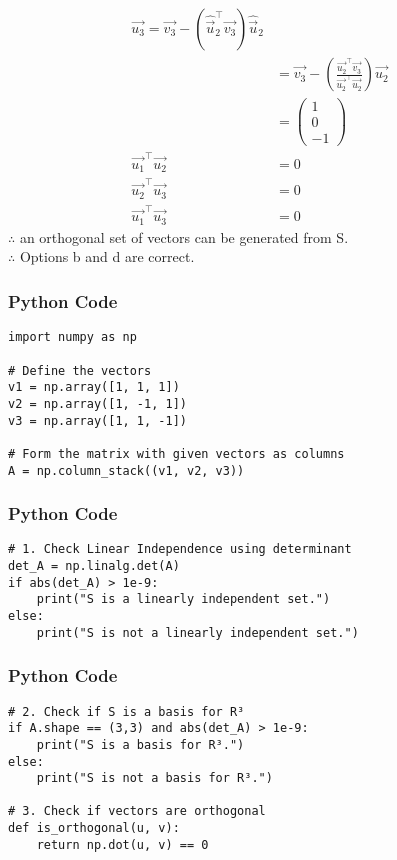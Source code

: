 \documentclass{beamer}
\begin{document}
\begin{frame}
\begin{align}
\vec{u_3}= \vec{v_3} - (\hat{\vec{u}}_2^\top \vec{v_3}) \hat{\vec{u}}_2 \\&= \vec{v_3} - \left( \frac{\vec{u_2}^\top \vec{v_3}}{\vec{u_2}^\top \vec{u_2}} \right) \vec{u_2} \\&= \begin{pmatrix} 1 \\ 0 \\ -1 \end{pmatrix}\\
\vec{u_1}^\top \vec{u_2} &= 0 \\\vec{u_2}^\top \vec{u_3} &= 0 \\\vec{u_1}^\top \vec{u_3} &= 0
\end{align}
$\therefore$ an orthogonal set of vectors can be generated from S.\\
$\therefore$ Options b and d are correct.
\end{frame}

\begin{frame}[fragile]
    \frametitle{Python Code}
    \begin{lstlisting}
import numpy as np

# Define the vectors
v1 = np.array([1, 1, 1])
v2 = np.array([1, -1, 1])
v3 = np.array([1, 1, -1])

# Form the matrix with given vectors as columns
A = np.column_stack((v1, v2, v3))
\end{lstlisting}
\end{frame}

\begin{frame}[fragile]
\frametitle{Python Code}
\begin{lstlisting}
# 1. Check Linear Independence using determinant
det_A = np.linalg.det(A)
if abs(det_A) > 1e-9:
    print("S is a linearly independent set.")
else:
    print("S is not a linearly independent set.")
\end{lstlisting}
\end{frame}

\begin{frame}[fragile]
\frametitle{Python Code}
\begin{lstlisting}
# 2. Check if S is a basis for R³
if A.shape == (3,3) and abs(det_A) > 1e-9:
    print("S is a basis for R³.")
else:
    print("S is not a basis for R³.")

# 3. Check if vectors are orthogonal
def is_orthogonal(u, v):
    return np.dot(u, v) == 0
\end{lstlisting}
\end{frame}
\end{document}
